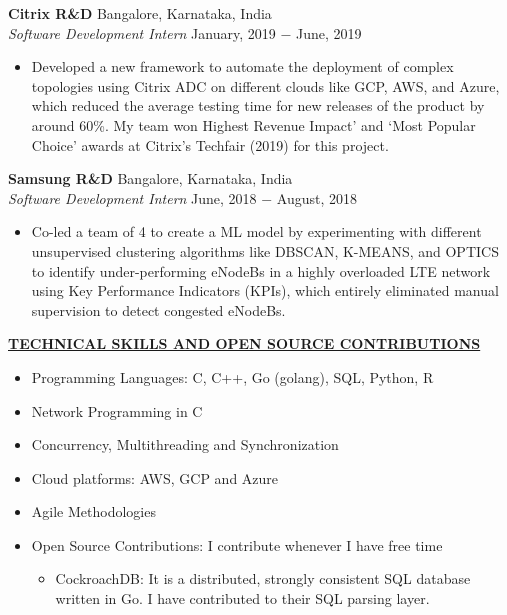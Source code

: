 \documentclass{article}
\begin{document}
\noindent \textbf{Citrix R\&D} \hfill Bangalore, Karnataka, India \\
\textit{Software Development Intern} \hfill January, 2019 $-$ June, 2019
\begin{itemize}[noitemsep,nolistsep,leftmargin=*]
\item {Developed a new framework to automate the deployment of complex topologies using Citrix ADC on different clouds like GCP, AWS, and Azure, which reduced the average testing time for new releases of the product by around 60\%. My team won Highest Revenue Impact’ and ‘Most Popular Choice’ awards at Citrix's Techfair (2019) for this project.\\}
\end{itemize}

\noindent \textbf{Samsung R\&D} \hfill Bangalore, Karnataka, India \\
\textit{Software Development Intern} \hfill June, 2018 $-$ August, 2018
\begin{itemize}[noitemsep,nolistsep,leftmargin=*]
\item {Co-led a team of 4 to create a ML model by experimenting with different unsupervised clustering algorithms like DBSCAN, K-MEANS, and OPTICS to identify under-performing eNodeBs in a highly overloaded LTE network using Key Performance Indicators (KPIs), which entirely eliminated manual supervision to detect congested eNodeBs. \\}
\end{itemize}

\noindent \textbf{\underline{TECHNICAL SKILLS AND OPEN SOURCE CONTRIBUTIONS}}
\begin{itemize}[noitemsep,nolistsep,leftmargin=*]
\item {Programming Languages: C, C++, Go (golang), SQL, Python, R}
\item {Network Programming in C}
\item {Concurrency, Multithreading and Synchronization}
\item {Cloud platforms: AWS, GCP and Azure}
\item {Agile Methodologies}
\item {Open Source Contributions: I contribute whenever I have free time}
\begin{itemize}
    \item CockroachDB: It is a distributed, strongly consistent SQL database written in Go. I have contributed to their SQL parsing layer. \\
\end{itemize}
\end{itemize}
\end{document}
